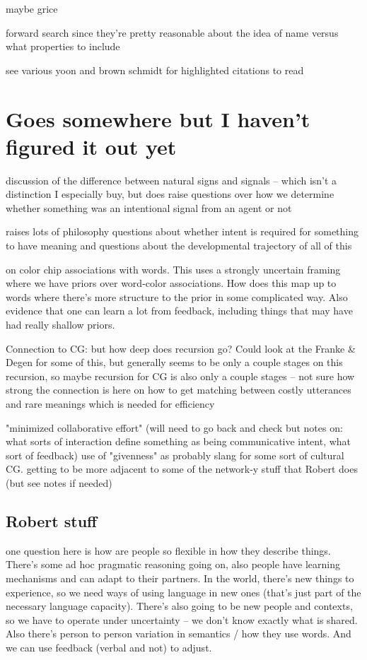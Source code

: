 \documentclass[]{article}
\begin{document}
maybe grice

forward search \cite{heller2012} since they're pretty reasonable about the idea of name versus what properties to include 


see various yoon and brown schmidt for highlighted citations to read 

\section{Goes somewhere but I haven't figured it out yet}
\cite{clark1996}
discussion of the difference between natural signs and signals -- which isn't a distinction I especially buy, but does raise questions over how we determine whether something was an intentional signal from an agent or not 

raises lots of philosophy questions about whether intent is required for something to have meaning and questions about the developmental trajectory of all of this 

\cite{murthy2022} on color chip associations with words. This uses a strongly uncertain framing where we have priors over word-color associations. How does this map up to words where there's more structure to the prior in some complicated way. Also evidence that one can learn a lot from feedback, including things that may have had really shallow priors. 

Connection to CG: but how deep does recursion go? Could look at the Franke \& Degen for some of this, but generally seems to be only a couple stages on this recursion, so maybe recursion for CG is also only a couple stages -- not sure how strong the connection is here
\cite{bergen} on how to get matching between costly utterances and rare meanings which is needed for efficiency


\cite{fay2010} "minimized collaborative effort" (will need to go back and check but notes on: what sorts of interaction define something as being communicative intent, what sort of feedback) use of "givenness" as probably slang for some sort of cultural CG. getting to be more adjacent to some of the network-y stuff that Robert does (but see notes if needed) 

\subsection{Robert stuff} 

\cite{hawkins2020b} one question here is how are people so flexible in how they describe things. There's some ad hoc pragmatic reasoning going on, also people have learning mechanisms and can adapt to their partners. In the world, there's new things to experience, so we need ways of using language in new ones (that's just part of the necessary language capacity). There's also going to be new people and contexts, so we have to operate under uncertainty -- we don't know exactly what is shared. Also there's person to person variation in semantics / how they use words. And we can use feedback (verbal and not) to adjust. 
\end{document}
